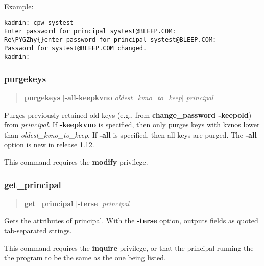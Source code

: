 \documentclass[letterpaper,10pt,english]{sphinxmanual}
\def\PYGZhy{\char`\-}
\begin{document}
Example:

\begin{Verbatim}[commandchars=\\\{\}]
kadmin: cpw systest
Enter password for principal systest@BLEEP.COM:
Re\PYGZhy{}enter password for principal systest@BLEEP.COM:
Password for systest@BLEEP.COM changed.
kadmin:
\end{Verbatim}
\label{admin/admin_commands/kadmin_local:change-password-end}

\subsubsection{purgekeys}
\label{admin/admin_commands/kadmin_local:id6}\label{admin/admin_commands/kadmin_local:change-password-end}\label{admin/admin_commands/kadmin_local:purgekeys}\begin{quote}

\textbf{purgekeys} {[}\textbf{-all}\textbar{}\textbf{-keepkvno} \emph{oldest\_kvno\_to\_keep}{]} \emph{principal}
\end{quote}

Purges previously retained old keys (e.g., from \textbf{change\_password
-keepold}) from \emph{principal}.  If \textbf{-keepkvno} is specified, then
only purges keys with kvnos lower than \emph{oldest\_kvno\_to\_keep}.  If
\textbf{-all} is specified, then all keys are purged.  The \textbf{-all} option
is new in release 1.12.

This command requires the \textbf{modify} privilege.
\label{admin/admin_commands/kadmin_local:purgekeys-end}

\subsubsection{get\_principal}
\label{admin/admin_commands/kadmin_local:get-principal}\label{admin/admin_commands/kadmin_local:id7}\label{admin/admin_commands/kadmin_local:purgekeys-end}\begin{quote}

\textbf{get\_principal} {[}\textbf{-terse}{]} \emph{principal}
\end{quote}

Gets the attributes of principal.  With the \textbf{-terse} option, outputs
fields as quoted tab-separated strings.

This command requires the \textbf{inquire} privilege, or that the principal
running the the program to be the same as the one being listed.
\end{document}

